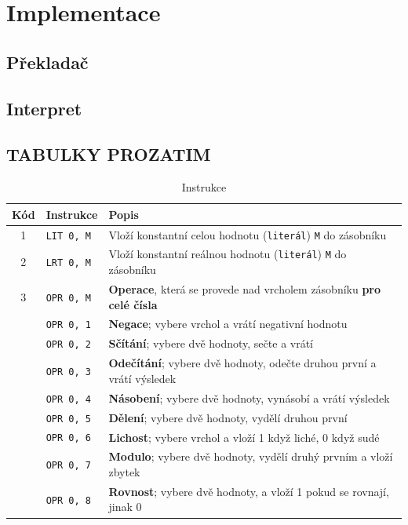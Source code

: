 \documentclass[
12pt,
a4paper,
pdftex,
czech,
titlepage
]{report}
\begin{document}
\chapter{Implementace}
\section{Překladač}
\section{Interpret}
\section{TABULKY PROZATIM}
\begin{longtable}{|c|l|p{10cm}|}
\caption{Instrukce}
\label{instrukce}
\endfirsthead
\endhead
\hline
		Kód & Instrukce & Popis \\
\hline\hline
\rule{0pt}{3ex}1 & \texttt{LIT 0, M} & Vloží konstantní celou hodnotu (\texttt{literál}) \texttt{M} do zásobníku \\ \hline
\rule{0pt}{3ex}2 & \texttt{LRT 0, M} & Vloží konstantní reálnou hodnotu (\texttt{literál}) \texttt{M} do zásobníku \\ \hline
\rule{0pt}{3ex}3 & \texttt{OPR 0, M} & \textbf{Operace}, která se provede nad vrcholem zásobníku \textbf{pro celé čísla} \\ \hline
\rule{0pt}{3ex} & \texttt{OPR 0, 1} & \textbf{Negace}; vybere vrchol a vrátí negativní hodnotu \\ \hline
\rule{0pt}{3ex} & \texttt{OPR 0, 2} & \textbf{Sčítání}; vybere dvě hodnoty, sečte a vrátí \\ \hline
\rule{0pt}{3ex} & \texttt{OPR 0, 3} & \textbf{Odečítání}; vybere dvě hodnoty, odečte druhou první a vrátí výsledek \\ \hline
\rule{0pt}{3ex} & \texttt{OPR 0, 4} & \textbf{Násobení}; vybere dvě hodnoty, vynásobí a vrátí výsledek \\ \hline
\rule{0pt}{3ex} & \texttt{OPR 0, 5} & \textbf{Dělení}; vybere dvě hodnoty, vydělí druhou první \\ \hline
\rule{0pt}{3ex} & \texttt{OPR 0, 6} & \textbf{Lichost}; vybere vrchol a vloží 1 když liché, 0 když sudé \\ \hline
\rule{0pt}{3ex} & \texttt{OPR 0, 7} & \textbf{Modulo}; vybere dvě hodnoty, vydělí druhý prvním a vloží zbytek \\ \hline
\rule{0pt}{3ex} & \texttt{OPR 0, 8} & \textbf{Rovnost}; vybere dvě hodnoty, a vloží 1 pokud se rovnají, jinak 0 \\ \hline

\end{longtable}
\end{document}
